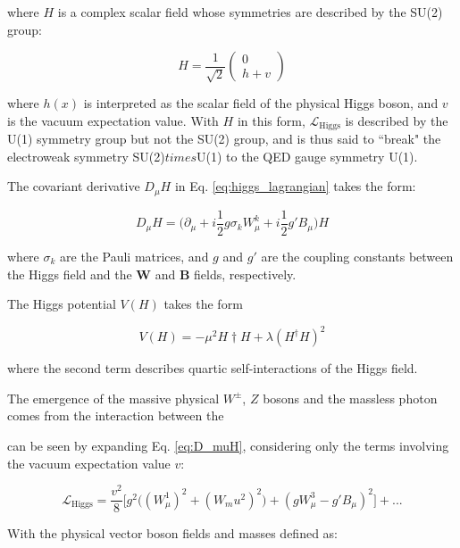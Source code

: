 \noindent where \(H\) is a complex scalar field whose symmetries are described by the SU(2) group:

\begin{equation}
H = \frac{1}{\sqrt{2}}
\begin{pmatrix}
0 \\
h+v
\end{pmatrix}
\end{equation}

\noindent where \(h(x)\) is interpreted as the scalar field of the physical Higgs boson, and \(v\) is the vacuum expectation value. With \(H\) in this form, \(\mathcal{L}_\text{Higgs}\) is described by the U(1) symmetry group but not the SU(2) group, and is thus said to ``break" the electroweak symmetry SU(2)\(times\)U(1) to the QED gauge symmetry U(1).

The covariant derivative \(D_\mu H\) in Eq. \ref{eq:higgs_lagrangian} takes the form:

\begin{equation}
\label{eq:D_muH}
D_\mu H = \big(\partial_\mu + i\frac{1}{2}g\sigma_k W^k_\mu+i\frac{1}{2}g'B_\mu\big)H
\end{equation}

\noindent where \(\sigma_k\) are the Pauli matrices, and \(g\) and \(g'\) are the coupling constants between the Higgs field and the \(\boldsymbol{W}\) and \(\boldsymbol{B}\) fields, respectively.

The Higgs potential \(V(H)\) takes the form 

\begin{equation}
V(H) = -\mu^2H\dagger H + \lambda(H^\dagger H)^2
\end{equation}

\noindent where the second term describes quartic self-interactions of the Higgs field.

The emergence of the massive physical \(W^\pm\), \(Z\) bosons and the massless photon comes from the interaction between the 

 can be seen by expanding Eq. \ref{eq:D_muH}, considering only the terms involving the vacuum expectation value \(v\):

\begin{equation}
\label{eq:higgs_expanded}
\mathcal{L}_\text{Higgs} = \frac{v^2}{8}\Big[g^2\big((W^1_\mu)^2+(W_mu^2)^2\big) + (gW^3_\mu-g'B_\mu)^2\Big] + ...
\end{equation}

With the physical vector boson fields and masses defined as:

